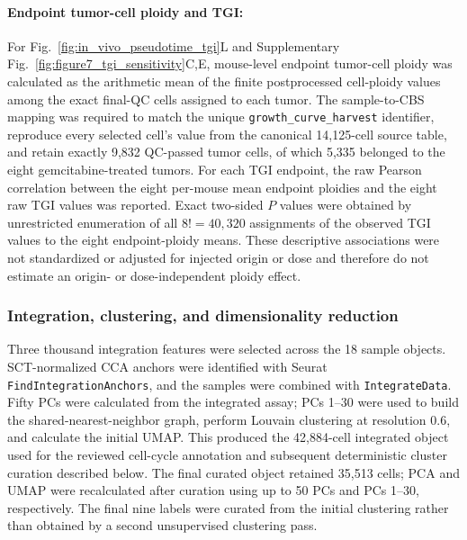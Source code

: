 \documentclass[11pt,notitlepage]{article}
\begin{document}
\paragraph{Endpoint tumor-cell ploidy and TGI:} For Fig.~\ref{fig:in_vivo_pseudotime_tgi}L and Supplementary Fig.~\ref{fig:figure7_tgi_sensitivity}C,E, mouse-level endpoint tumor-cell ploidy was calculated as the arithmetic mean of the finite postprocessed cell-ploidy values among the exact final-QC cells assigned to each tumor. The sample-to-CBS mapping was required to match the unique \texttt{growth\_curve\_harvest} identifier, reproduce every selected cell's value from the canonical 14,125-cell source table, and retain exactly 9,832 QC-passed tumor cells, of which 5,335 belonged to the eight gemcitabine-treated tumors. For each TGI endpoint, the raw Pearson correlation between the eight per-mouse mean endpoint ploidies and the eight raw TGI values was reported. Exact two-sided \(P\) values were obtained by unrestricted enumeration of all \(8!=40{,}320\) assignments of the observed TGI values to the eight endpoint-ploidy means. These descriptive associations were not standardized or adjusted for injected origin or dose and therefore do not estimate an origin- or dose-independent ploidy effect.



\clearpage




\subsubsection{Integration, clustering, and dimensionality reduction}
Three thousand integration features were selected across the 18 sample objects. SCT-normalized CCA anchors were identified with Seurat \texttt{FindIntegrationAnchors}, and the samples were combined with \texttt{IntegrateData}. Fifty PCs were calculated from the integrated assay; PCs 1--30 were used to build the shared-nearest-neighbor graph, perform Louvain clustering at resolution 0.6, and calculate the initial UMAP. This produced the 42,884-cell integrated object used for the reviewed cell-cycle annotation and subsequent deterministic cluster curation described below. The final curated object retained 35,513 cells; PCA and UMAP were recalculated after curation using up to 50 PCs and PCs 1--30, respectively. The final nine labels were curated from the initial clustering rather than obtained by a second unsupervised clustering pass.
\end{document}
